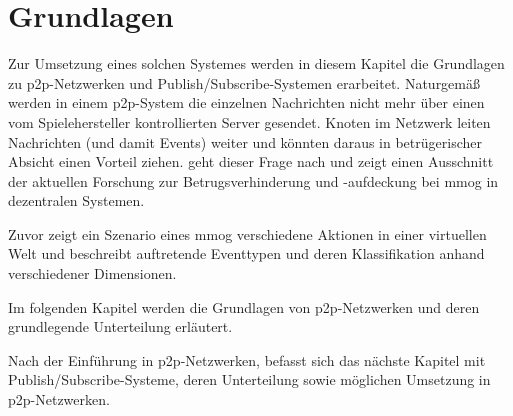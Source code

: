 \chapter{Grundlagen}
\label{chap:grundlagen}

Zur Umsetzung eines solchen Systemes werden in diesem Kapitel die Grundlagen zu \ac{p2p}-Netzwerken und Publish/Subscribe-Systemen erarbeitet. Naturgemäß werden in einem \ac{p2p}-System die einzelnen Nachrichten nicht mehr über einen vom Spielehersteller kontrollierten Server gesendet. Knoten im Netzwerk leiten Nachrichten (und damit Events) weiter und könnten daraus in betrügerischer Absicht einen Vorteil ziehen.  geht dieser Frage nach und zeigt einen Ausschnitt der aktuellen Forschung zur Betrugsverhinderung und -aufdeckung bei \ac{mmog} in dezentralen Systemen.

Zuvor zeigt ein Szenario eines \ac{mmog} verschiedene Aktionen in einer virtuellen Welt und beschreibt auftretende Eventtypen und deren Klassifikation anhand verschiedener Dimensionen.



Im folgenden Kapitel werden die Grundlagen von \ac{p2p}-Netzwerken und deren grundlegende Unterteilung erläutert.







Nach der Einführung in \ac{p2p}-Netzwerken, befasst sich das nächste Kapitel mit Publish/Subscribe-Systeme, deren Unterteilung sowie möglichen Umsetzung in \ac{p2p}-Netzwerken. 


